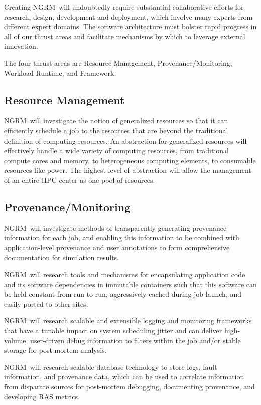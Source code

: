 \documentclass{article}
\newcommand{\ngrm}{NGRM}
\begin{document}
Creating \ngrm\ will undoubtedly
require substantial collaborative efforts for research, design, development
and deployment, which involve many experts from different expert domains.
The software architecture must bolster rapid progress in all of our thrust
areas and facilitate mechanisms by which to leverage external innovation.

The four thrust areas are Resource Management, Provenance/Monitoring,
Workload Runtime, and Framework.

\subsection{Resource Management}

\ngrm\ will investigate the notion of generalized resources so that
it can efficiently schedule a job to the resources that are beyond the
traditional definition of computing resources. An abstraction for
generalized resources will effectively handle a wide variety of computing
resources, from traditional compute cores and memory, to heterogeneous
computing elements, to consumable resources like power.
The highest-level of abstraction will allow the management of an
entire HPC center as one pool of resources.

\subsection{Provenance/Monitoring}

\ngrm\ will investigate methods of transparently generating provenance
information for each job, and enabling this information to be combined
with application-level provenance and user annotations to form
comprehensive documentation for simulation results.

\ngrm\ will research tools and mechanisms for encapsulating application
code and its software dependencies in immutable containers such that
this software can be held constant from run to run, aggressively
cached during job launch, and easily ported to other sites.

\ngrm\ will research scalable and extensible logging and monitoring
frameworks that have a tunable impact on system scheduling jitter and
can deliver high-volume, user-driven debug information to filters within
the job and/or stable storage for post-mortem analysis.

\ngrm\ will research scalable database technology to store
logs, fault information, and provenance data, which can be used
to correlate information from disparate sources for post-mortem debugging,
documenting provenance, and developing RAS metrics.
\end{document}
